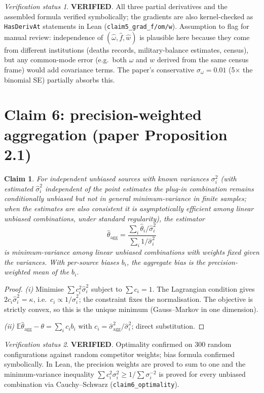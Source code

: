 \documentclass[11pt,a4paper]{article}
\theoremstyle{plain}
\newtheorem{claim}{Claim}
\theoremstyle{remark}
\newtheorem*{verification}{Verification status}
\newcommand{\E}{\mathbb{E}}
\newcommand{\PASS}{\textcolor{green!50!black}{\textbf{VERIFIED}}}
\begin{document}
\begin{verification}
\PASS. All three partial derivatives and the assembled formula verified symbolically; the gradients are also kernel-checked as \texttt{HasDerivAt} statements in Lean (\texttt{claim5\_grad\_f/om/w}). Assumption to flag for manual review: independence of $(\hat\omega,\hat f,\hat w)$ is plausible here because they come from different institutions (deaths records, military-balance estimates, census), but any common-mode error (e.g.\ both $\omega$ and $w$ derived from the same census frame) would add covariance terms. The paper's conservative $\sigma_\omega=0.01$ (5$\times$ the binomial SE) partially absorbs this.
\end{verification}

\section{Claim 6: precision-weighted aggregation (paper Proposition 2.1)}

\begin{claim}
For independent unbiased sources with known variances $\sigma_i^2$ (with estimated $\hat\sigma_i^2$ independent of the point estimates the plug-in combination remains conditionally unbiased but not in general minimum-variance in finite samples; when the estimates are also consistent it is asymptotically efficient among linear unbiased combinations, under standard regularity), the estimator
\[
\hat\theta_{\mathrm{agg}}=\frac{\sum_i\hat\theta_i/\hat\sigma_i^2}{\sum_i 1/\hat\sigma_i^2}
\]
is minimum-variance among linear unbiased combinations with weights fixed given the variances. With per-source biases $b_i$, the aggregate bias is the precision-weighted mean of the $b_i$.
\end{claim}

\begin{proof}
\emph{(i)} Minimise $\sum c_i^2\hat\sigma_i^2$ subject to $\sum c_i=1$. The Lagrangian condition gives $2c_i\hat\sigma_i^2=\kappa$, i.e.\ $c_i\propto 1/\hat\sigma_i^2$; the constraint fixes the normalisation. The objective is strictly convex, so this is the unique minimum (Gauss--Markov in one dimension).

\emph{(ii)} $\E\hat\theta_{\mathrm{agg}}-\theta=\sum_i c_i b_i$ with $c_i=\hat\sigma_{\mathrm{agg}}^2/\hat\sigma_i^2$; direct substitution.
\end{proof}

\begin{verification}
\PASS. Optimality confirmed on 300 random configurations against random competitor weights; bias formula confirmed symbolically. In Lean, the precision weights are proved to sum to one and the minimum-variance inequality $\sum c_i^2\sigma_i^2\ge 1/\sum\sigma_i^{-2}$ is proved for every unbiased combination via Cauchy--Schwarz (\texttt{claim6\_optimality}).
\end{verification}
\end{document}

